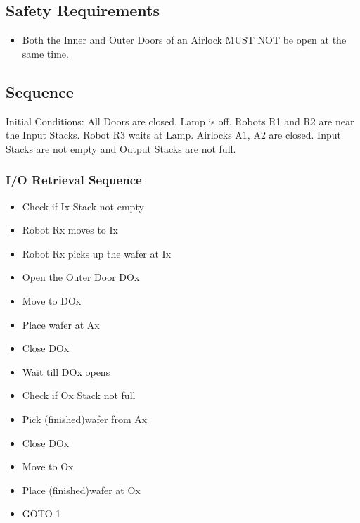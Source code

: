 \documentclass[a4paper,12pt]{article}
\begin{document}
\subsection{Safety Requirements}
\begin{itemize}
\item Both the Inner and Outer Doors of an Airlock MUST NOT be open at the same time.
\end{itemize}

\subsection{Sequence}
Initial Conditions: All Doors are closed. Lamp is off. Robots R1 and R2 are near the Input Stacks. Robot R3 waits at Lamp. Airlocks A1, A2 are closed. Input Stacks are not empty and Output Stacks are not full.
\subsubsection {I/O Retrieval Sequence }
\begin{itemize}
\item Check if Ix Stack not empty
\item Robot Rx moves to Ix
\item Robot Rx picks up the wafer at Ix 
\item Open the Outer Door DOx
\item Move to DOx
\item Place wafer at Ax
\item Close DOx
\item Wait till DOx opens
\item Check if Ox Stack not full
\item Pick (finished)wafer from Ax
\item Close DOx
\item Move to Ox
\item Place (finished)wafer at Ox
\item GOTO 1
\end{itemize}
\end{document}
